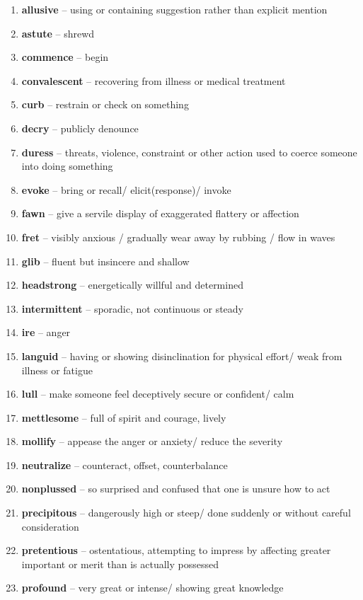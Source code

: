 \begin{enumerate}[wide,labelindent=0pt]
\item \textbf{allusive} -- using or containing suggestion rather than explicit mention
\item \textbf{astute} -- shrewd
\item \textbf{commence} -- begin
\item \textbf{convalescent} -- recovering from illness or medical treatment
\item \textbf{curb} -- restrain or check on something
\item \textbf{decry} -- publicly denounce
\item \textbf{duress} -- threats, violence, constraint or other action used to coerce someone into doing something
\item \textbf{evoke} -- bring or recall/ elicit(response)/ invoke
\item \textbf{fawn} -- give a servile display of exaggerated flattery or affection
\item \textbf{fret} -- visibly anxious / gradually wear away by rubbing / flow in waves
\item \textbf{glib} -- fluent but insincere and shallow
\item \textbf{headstrong} -- energetically willful and determined
\item \textbf{intermittent} -- sporadic, not continuous or steady
\item \textbf{ire} -- anger
\item \textbf{languid} -- having or showing disinclination for physical effort/ weak from illness or fatigue
\item \textbf{lull} -- make someone feel deceptively secure or confident/ calm
\item \textbf{mettlesome} -- full of spirit and courage, lively
\item \textbf{mollify} -- appease the anger or anxiety/ reduce the severity
\item \textbf{neutralize} -- counteract, offset, counterbalance
\item \textbf{nonplussed} -- so surprised and confused that one is unsure how to act
\item \textbf{precipitous} -- dangerously high or steep/ done suddenly or without careful consideration
\item \textbf{pretentious} -- ostentatious, attempting to impress by affecting greater important or merit than is actually possessed
\item \textbf{profound} -- very great or intense/ showing great knowledge

\end{enumerate}
